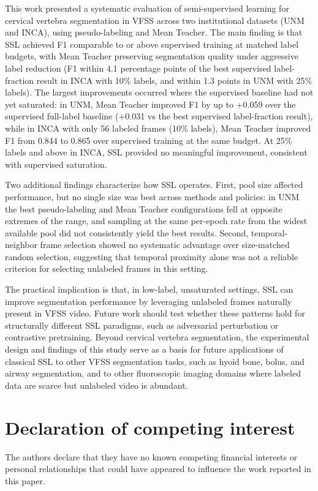 \documentclass[a4paper,fleqn]{cas-dc}
\begin{document}
This work presented a systematic evaluation of semi-supervised learning for cervical vertebra segmentation in VFSS across two institutional datasets (UNM and INCA), using pseudo-labeling and Mean Teacher.
The main finding is that SSL achieved F1 comparable to or above supervised training at matched label budgets, with Mean Teacher preserving segmentation quality under aggressive label reduction (F1 within 4.1 percentage points of the best supervised label-fraction result in INCA with 10\% labels, and within 1.3 points in UNM with 25\% labels).
The largest improvements occurred where the supervised baseline had not yet saturated: in UNM, Mean Teacher improved F1 by up to +0.059 over the supervised full-label baseline (+0.031 vs the best supervised label-fraction result), while in INCA with only 56 labeled frames (10\% labels), Mean Teacher improved F1 from 0.844 to 0.865 over supervised training at the same budget.
At 25\% labels and above in INCA, SSL provided no meaningful improvement, consistent with supervised saturation.

Two additional findings characterize how SSL operates.
First, pool size affected performance, but no single size was best across methods and policies: in UNM the best pseudo-labeling and Mean Teacher configurations fell at opposite extremes of the range, and sampling at the same per-epoch rate from the widest available pool did not consistently yield the best results.
Second, temporal-neighbor frame selection showed no systematic advantage over size-matched random selection, suggesting that temporal proximity alone was not a reliable criterion for selecting unlabeled frames in this setting.

The practical implication is that, in low-label, unsaturated settings, SSL can improve segmentation performance by leveraging unlabeled frames naturally present in VFSS video.
Future work should test whether these patterns hold for structurally different SSL paradigms, such as adversarial perturbation or contrastive pretraining.
Beyond cervical vertebra segmentation, the experimental design and findings of this study serve as a basis for future applications of classical SSL to other VFSS segmentation tasks, such as hyoid bone, bolus, and airway segmentation, and to other fluoroscopic imaging domains where labeled data are scarce but unlabeled video is abundant.

\section*{Declaration of competing interest}
The authors declare that they have no known competing financial interests or personal relationships that could have appeared to influence the work reported in this paper.
\end{document}
